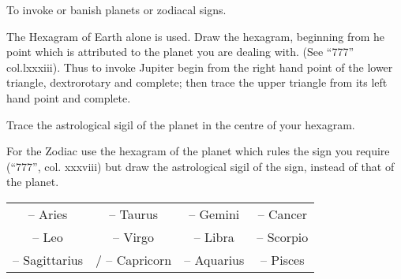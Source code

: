 To invoke or banish planets or zodiacal signs.


The Hexagram of Earth alone is used. Draw the hexagram, beginning from he point which is attributed to the planet you are dealing with. (See \enquote{777} col.lxxxiii). Thus to invoke Jupiter begin from the right hand point of the lower triangle, dextrorotary and complete; then trace the upper triangle from its left hand point and complete.

Trace the astrological sigil of the planet in the centre of your hexagram.

For the Zodiac use the hexagram of the planet which rules the sign you require (\enquote{777}, col. xxxviii) but draw the astrological sigil of the sign, instead of that of the planet.

{\centering\raggedbottom
 \begin{tabular}{c c c c}
 \Aries{}\footnotemark -- Aries & \Taurus{} -- Taurus & \Gemini{} -- Gemini & \Cancer{} -- Cancer \\
 \Leo{} -- Leo & \Virgo{} -- Virgo & \Libra{} -- Libra & \Scorpio{} -- Scorpio \\
 \Sagittarius{} -- Sagittarius & \Capricorn{}/\varCapricorn{} -- Capricorn & \Aquarius{} -- Aquarius & \Pisces{} -- Pisces
 \end{tabular}
 \par
}

